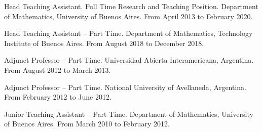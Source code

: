 Head Teaching Assistant. Full Time Research and Teaching Position. 
Department of Mathematics, University of Buenos Aires. From April 2013 to
February 2020.

Head Teaching Assistant -- Part Time. Department of Mathematics, Technology 
Institute of Buenos Aires. From August 2018 to December 2018.

Adjunct Professor -- Part Time. Universidad Abierta Interamericana, Argentina.
From August 2012 to March 2013.

Adjunct Professor -- Part Time. National University of Avellaneda, Argentina.
From February 2012 to June 2012.

Junior Teaching Assistant -- Part Time. Department of Mathematics, University of Buenos Aires. From March 2010 to February 2012.
